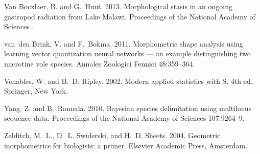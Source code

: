 \documentclass[12pt,letterpaper]{article}
\begin{document}
\begin{thebibliography}{77}
{Van Bocxlaer}, B. and G.~Hunt. 2013. {Morphological stasis in an ongoing
  gastropod radiation from Lake Malawi}. Proceedings of the National Academy of
  Sciences .

van~den Brink, V. and F.~Bokma. 2011. {Morphometric shape analysis using
  learning vector quantization neural networks — an example distinguishing
  two microtine vole species}. Annales Zoologici Fennici 48:359--364.

Venables, W. and B.~D. Ripley. 2002. {Modern applied statistics with S}. 4th
  ed. Springer, New York.

Yang, Z. and B.~Rannala. 2010. {Bayesian species delimitation using multilocus
  sequence data.} Proceedings of the National Academy of Sciences 107:9264--9.

Zelditch, M.~L., D.~L. Swiderski, and H.~D. Sheets. 2004. {Geometric
  morphometrics for biologists: a primer}. Elsevier Academic Press, Amsterdam.

\end{thebibliography}

\clearpage

\begin{table}[ht]
  \centering
  \caption{AUC values for the best model of each classification scheme for both the observed (training) data and the generalized (testing) data. Results from all three different supervised learning approaches are shown here. AUC values range between 0.5 and 1. }
  \label{tab:comp}
\end{table}
\end{document}
